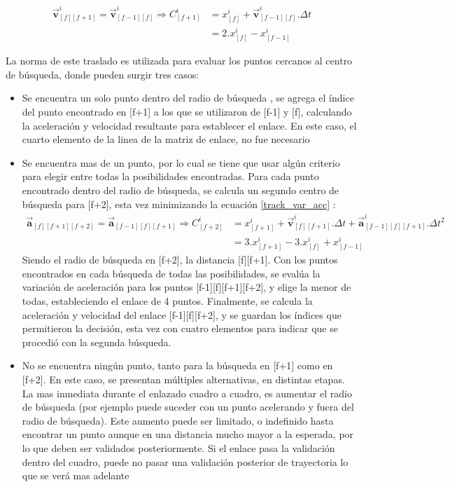 \begin{equation}
\begin{split}
\boldsymbol{\overrightarrow{v}}_{[f][f+1]}^{i} = \boldsymbol{\overrightarrow{v}}_{[f-1][f]}^{i} \Rightarrow C_{[f+1]}^{i} &= x_{[f]}^{i} + \boldsymbol{\overrightarrow{v}}_{[f-1][f]}^{i}.\Delta{t} \\
&= 2.x_{[f]}^{i} -x_{[f-1]}^{i} 
\end{split}
\label{centro_busqueda_f1}
\end{equation}

La norma de este traslado es utilizada para evaluar los puntos cercanos al centro de búsqueda, donde pueden surgir tres casos:

\begin{itemize}
\item Se encuentra un solo punto dentro del radio de búsqueda , se agrega el índice del punto encontrado en [f+1] a los que se utilizaron de [f-1] y [f], calculando la aceleración y velocidad resultante para establecer el enlace. En este caso, el cuarto elemento de la linea de la matriz de enlace, no fue necesario 
\item Se encuentra mas de un punto, por lo cual se tiene que usar algún criterio para elegir entre todas la posibilidades encontradas. Para cada punto encontrado dentro del radio de búsqueda, se calcula un segundo centro de búsqueda para [f+2], esta vez minimizando la ecuación \ref{track_var_acc} :
\begin{equation}
\begin{split}
\boldsymbol{\overrightarrow{a}}_{[f][f+1][f+2]}=\boldsymbol{\overrightarrow{a}}_{[f-1][f][f+1]} \Rightarrow C_{[f+2]}^{i} &= x_{[f+1]}^{i} + \boldsymbol{\overrightarrow{v}}_{[f][f+1]}^{i}.\Delta{t} + \boldsymbol{\overrightarrow{a}}_{[f-1][f][f+1]}^{i}.\Delta{t}^2\\
&= 3.x_{[f+1]}^{i} - 3.x_{[f]}^{i} + x_{[f-1]}^{i}\end{split}
\label{centro_busqueda_f2}
\end{equation}
Siendo el radio de búsqueda en [f+2], la distancia [f][f+1]. Con los puntos encontrados en cada búsqueda de todas las posibilidades, se evalúa la variación de aceleración para los puntos [f-1][f][f+1][f+2], y elige la menor de todas, estableciendo el enlace de 4 puntos. Finalmente, se calcula la aceleración y velocidad del enlace [f-1][f][f+2], y se guardan los índices que permitieron la decisión, esta vez con cuatro elementos para indicar que se procedió con la segunda búsqueda.
\item No se encuentra ningún punto, tanto para la búsqueda en [f+1] como en [f+2]. En este caso, se presentan múltiples alternativas, en distintas etapas. La mas inmediata durante el enlazado cuadro a cuadro, es aumentar el radio de búsqueda (por ejemplo puede suceder con un punto acelerando y fuera del radio de búsqueda). Este aumento puede ser limitado, o indefinido hasta encontrar un punto aunque en una distancia mucho mayor a la esperada, por lo que deben ser validados posteriormente. Si el enlace pasa la validación dentro del cuadro, puede no pasar una validación posterior de trayectoria lo que se verá mas adelante
\end{itemize}

